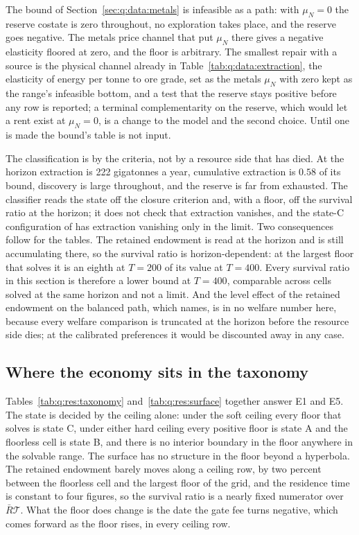  The bound of Section~\ref{sec:q:data:metals} is infeasible as a path: with $\mu_N=0$ the reserve costate is zero throughout, no exploration takes place, and the reserve goes negative. The metals price channel that put $\mu_N$ there gives a negative elasticity floored at zero, and the floor is arbitrary. The smallest repair with a source is the physical channel already in Table~\ref{tab:q:data:extraction}, the elasticity of energy per tonne to ore grade, set as the metals $\mu_N$ with zero kept as the range's infeasible bottom, and a test that the reserve stays positive before any row is reported; a terminal complementarity on the reserve, which would let a rent exist at $\mu_N=0$, is a change to the model and the second choice. Until one is made the bound's table is not input.

 The classification is by the criteria, not by a resource side that has died. At the horizon extraction is 222 gigatonnes a year, cumulative extraction is $0.58$ of its bound, discovery is large throughout, and the reserve is far from exhausted. The classifier reads the state off the closure criterion and, with a floor, off the survival ratio at the horizon; it does not check that extraction vanishes, and the state-C configuration of  has extraction vanishing only in the limit. Two consequences follow for the tables. The retained endowment is read at the horizon and is still accumulating there, so the survival ratio is horizon-dependent: at the largest floor that solves it is an eighth at $T=200$ of its value at $T=400$. Every survival ratio in this section is therefore a lower bound at $T=400$, comparable across cells solved at the same horizon and not a limit. And the level effect of the retained endowment on the balanced path, which  names, is in no welfare number here, because every welfare comparison is truncated at the horizon before the resource side dies; at the calibrated preferences it would be discounted away in any case.

\subsection{Where the economy sits in the taxonomy}\label{sec:q:res:taxonomy}

Tables~\ref{tab:q:res:taxonomy} and~\ref{tab:q:res:surface} together answer E1 and E5. The state is decided by the ceiling alone: under the soft ceiling every floor that solves is state C, under either hard ceiling every positive floor is state A and the floorless cell is state B, and there is no interior boundary in the floor anywhere in the solvable range. The surface has no structure in the floor beyond a hyperbola. The retained endowment barely moves along a ceiling row, by two percent between the floorless cell and the largest floor of the grid, and the residence time is constant to four figures, so the survival ratio is a nearly fixed numerator over $\bar R\mathcal T$. What the floor does change is the date the gate fee turns negative, which comes forward as the floor rises, in every ceiling row.

